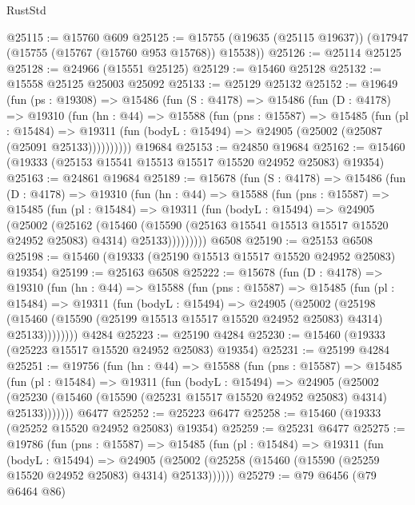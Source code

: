 \begin{lexlean}{RustStd}
\begin{coremodule}
@25115 := @15760 @609
@25125 := @15755 (@19635 (@25115 @19637)) (@17947 (@15755 (@15767 (@15760 @953 @15768)) @15538))
@25126 := @25114 @25125
@25128 := @24966 (@15551 @25125)
@25129 := @15460 @25128
@25132 := @15558 @25125 @25003 @25092
@25133 := @25129 @25132
@25152 := @19649
    (fun (ps : @19308) =>
    @15486
      (fun (S : @4178) =>
      @15486
        (fun (D : @4178) =>
        @19310
          (fun (hn : @44) =>
          @15588
            (fun (pns : @15587) =>
            @15485
              (fun (pl : @15484) =>
              @19311 (fun (bodyL : @15494) => @24905 (@25002 (@25087 (@25091 @25133))))))))))
    @19684
@25153 := @24850 @19684
@25162 := @15460 (@19333 (@25153 @15541 @15513 @15517 @15520 @24952 @25083) @19354)
@25163 := @24861 @19684
@25189 := @15678
    (fun (S : @4178) =>
    @15486
      (fun (D : @4178) =>
      @19310
        (fun (hn : @44) =>
        @15588
          (fun (pns : @15587) =>
          @15485
            (fun (pl : @15484) =>
            @19311
              (fun (bodyL : @15494) =>
              @24905
                (@25002
                  (@25162
                    (@15460
                      (@15590 (@25163 @15541 @15513 @15517 @15520 @24952 @25083) @4314)
                      @25133)))))))))
    @6508
@25190 := @25153 @6508
@25198 := @15460 (@19333 (@25190 @15513 @15517 @15520 @24952 @25083) @19354)
@25199 := @25163 @6508
@25222 := @15678
    (fun (D : @4178) =>
    @19310
      (fun (hn : @44) =>
      @15588
        (fun (pns : @15587) =>
        @15485
          (fun (pl : @15484) =>
          @19311
            (fun (bodyL : @15494) =>
            @24905
              (@25002
                (@25198
                  (@15460 (@15590 (@25199 @15513 @15517 @15520 @24952 @25083) @4314) @25133))))))))
    @4284
@25223 := @25190 @4284
@25230 := @15460 (@19333 (@25223 @15517 @15520 @24952 @25083) @19354)
@25231 := @25199 @4284
@25251 := @19756
    (fun (hn : @44) =>
    @15588
      (fun (pns : @15587) =>
      @15485
        (fun (pl : @15484) =>
        @19311
          (fun (bodyL : @15494) =>
          @24905
            (@25002
              (@25230 (@15460 (@15590 (@25231 @15517 @15520 @24952 @25083) @4314) @25133)))))))
    @6477
@25252 := @25223 @6477
@25258 := @15460 (@19333 (@25252 @15520 @24952 @25083) @19354)
@25259 := @25231 @6477
@25275 := @19786
    (fun (pns : @15587) =>
    @15485
      (fun (pl : @15484) =>
      @19311
        (fun (bodyL : @15494) =>
        @24905 (@25002 (@25258 (@15460 (@15590 (@25259 @15520 @24952 @25083) @4314) @25133))))))
@25279 := @79 @6456 (@79 @6464 @86)

\end{coremodule}
\end{lexlean}
